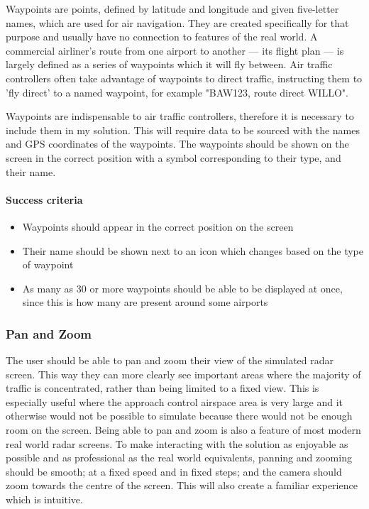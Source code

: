 \documentclass{article}
\begin{document}
Waypoints are points, defined by latitude and longitude and given five-letter names, which are used for air navigation.
They are created specifically for that purpose and usually have no connection to features of the real world\cite{waypoint}.
A commercial airliner's route from one airport to another --- its flight plan --- is largely defined as a series of waypoints which it will fly between.
Air traffic controllers often take advantage of waypoints to direct traffic, instructing them to 'fly direct' to a named waypoint, for example "BAW123, route direct WILLO".

Waypoints are indispensable to air traffic controllers, therefore it is necessary to include them in my solution.
This will require data to be sourced with the names and GPS coordinates of the waypoints.
The waypoints should be shown on the screen in the correct position with a symbol corresponding to their type, and their name.

\paragraph{Success criteria}
\begin{itemize}
    \item Waypoints should appear in the correct position on the screen
    \item Their name should be shown next to an icon which changes based on the type of waypoint
    \item As many as 30 or more waypoints should be able to be displayed at once, since this is how many are present around some airports
\end{itemize}

\subsubsection{Pan and Zoom}
The user should be able to pan and zoom their view of the simulated radar screen.
This way they can more clearly see important areas where the majority of traffic is concentrated, rather than being limited to a fixed view.
This is especially useful where the approach control airspace area is very large and it otherwise would not be possible to simulate because there would not be enough room on the screen.
Being able to pan and zoom is also a feature of most modern real world radar screens.
To make interacting with the solution as enjoyable as possible and as professional as the real world equivalents, panning and zooming should be smooth; at a fixed speed and in fixed steps; and the camera should zoom towards the centre of the screen.
This will also create a familiar experience which is intuitive.
\end{document}
